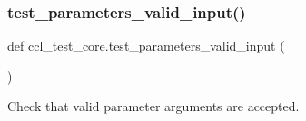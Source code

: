\subsubsection{\texorpdfstring{test\+\_\+parameters\+\_\+valid\+\_\+input()}{test\_parameters\_valid\_input()}}
{\footnotesize\ttfamily def ccl\+\_\+test\+\_\+core.\+test\+\_\+parameters\+\_\+valid\+\_\+input (\begin{DoxyParamCaption}{ }\end{DoxyParamCaption})}

\begin{DoxyVerb}Check that valid parameter arguments are accepted.
\end{DoxyVerb}
 